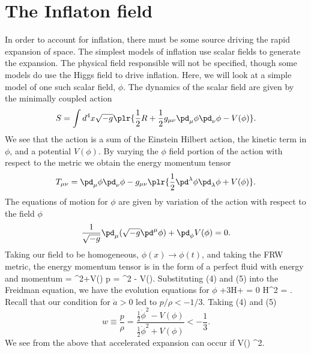 \documentclass[10pt,letterpaper]{article}
\begin{document}
\section{The Inflaton field}
In order to account for inflation, there must be some source driving the rapid expansion of space. The simplest models of inflation use scalar fields to generate the expansion. The physical field responsible will not be specified, though some models do use the Higgs field to drive inflation. Here, we will look at a simple model of one such scalar field, $\phi$. The dynamics of the scalar field are given by the minimally coupled action
\[
	S = \int d^4x\sqrt{-g}\plr{\frac12 R+\frac12 g_{\mu\nu}\pd_\mu \phi \pd_\nu \phi - V(\phi)}.
\]
We see that the action is a sum of the Einstein Hilbert action, the kinetic term in $\phi$, and a potential $V(\phi)$. By varying the $\phi$ field portion of the action with respect to the metric we obtain the energy momentum tensor
\[
	T_{\mu\nu} = \pd_\mu\phi\pd_\nu\phi -g_{\mu\nu}\plr{\frac12 \pd^\lambda\phi \pd_\lambda \phi+V(\phi)}.
\]
The equations of motion for $\phi$ are given by variation of the action with respect to the field $\phi$ 
\[
	\frac{1}{\sqrt{-g}}\pd_\mu(\sqrt{-g}\pd^\mu \phi)+\pd_\phi V(\phi) = 0.
\]
Taking our field to be homogeneous, $\phi(x) \to \phi(t)$, and taking the FRW metric, the energy momentum tensor is in the form of a perfect fluid with energy and momentum
\be
	\rho =  \dot\phi^2+V(\phi)
\ee
\be
	p =  \dot\phi^2 - V(\phi).
\ee
Substituting  (4) and (5) into the Freidman equation, we have the evolution equations for $\phi$
\be
	\ddot \phi +3H\dot\phi+ = 0
\ee
\be
	H^2 = .
\ee
Recall that our condition for $\ddot a >0$ led to $p/\rho < -1/3$. Taking (4) and (5)
\[
	w\equiv \frac p\rho  = \frac{\frac12 \dot\phi^2 -V(\phi)}{\frac12 \dot\phi^2 +V(\phi)} < -\frac13.
\]
We see from the above that accelerated expansion can occur if 
\be
	V(\phi) \gg  \dot\phi^2.
\ee
\end{document}

